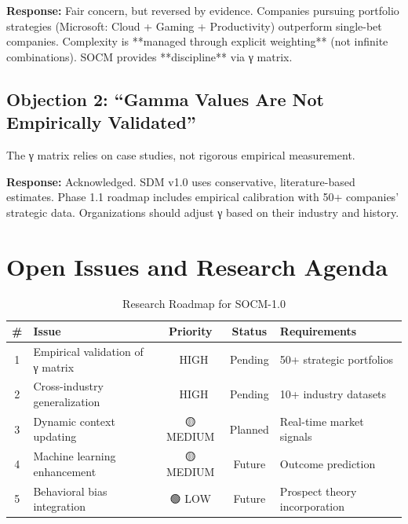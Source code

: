\textbf{Response:} Fair concern, but reversed by evidence. Companies pursuing portfolio strategies (Microsoft: Cloud + Gaming + Productivity) outperform single-bet companies. Complexity is **managed through explicit weighting** (not infinite combinations). SOCM provides **discipline** via γ matrix.

\subsection{Objection 2: ``Gamma Values Are Not Empirically Validated''}

\begin{tcolorbox}[colback=red!5!white, colframe=red!50!black,
    title=Objection: Complementarity Estimates Lack Data]
The γ matrix relies on case studies, not rigorous empirical measurement.
\end{tcolorbox}

\textbf{Response:} Acknowledged. SDM v1.0 uses conservative, literature-based estimates. Phase 1.1 roadmap includes empirical calibration with 50+ companies' strategic data. Organizations should adjust γ based on their industry and history.

\section{Open Issues and Research Agenda}
\label{sec:socm-open}

\begin{table}[htbp]
\centering
\caption{Research Roadmap for SOCM-1.0}
\label{tab:socm-roadmap}
\renewcommand{\arraystretch}{1.3}
\begin{tabular}{@{}clccl@{}}
\toprule
\textbf{\#} & \textbf{Issue} & \textbf{Priority} & \textbf{Status} & \textbf{Requirements} \\
\midrule
1 & Empirical validation of γ matrix & 🔴 HIGH & Pending & 50+ strategic portfolios \\
2 & Cross-industry generalization & 🔴 HIGH & Pending & 10+ industry datasets \\
3 & Dynamic context updating & 🟡 MEDIUM & Planned & Real-time market signals \\
4 & Machine learning enhancement & 🟡 MEDIUM & Future & Outcome prediction \\
5 & Behavioral bias integration & 🟢 LOW & Future & Prospect theory incorporation \\
\bottomrule
\end{tabular}
\end{table}

